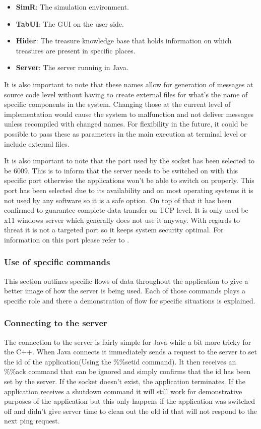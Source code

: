         \begin{itemize}
          \item \textbf{SimR}: The simulation environment.
          \item \textbf{TabUI}: The GUI on the user side.
          \item \textbf{Hider}: The treasure knowledge base that holds information on which treasures are present in specific places.
          \item \textbf{Server}: The server running in Java.
        \end{itemize}

      It is also important to note that these names allow for generation of messages at source code level without having to create external files for what's the name of specific components in the system. Changing those at the current level of implementation would cause the system to malfunction and not deliver messages unless recompiled with changed names. For flexibility in the future, it could be possible to pass these as parameters in the main execution at terminal level or include external files.

      It is also important to note that the port used by the socket has been selected to be 6009. This is to inform that the server needs to be switched on with this specific port otherwise the applications won't be able to switch on properly. This port has been selected due to its availability and on most operating systems it is not used by any software so it is a safe option. On top of that it has been confirmed to guarantee complete data transfer on TCP level. It is only used be x11 windows server which generally does not use it anyway. With regards to threat it is not a targeted port so it keeps system security optimal. For information on this port please refer to \cite{port6009}.

    \subsubsection{Use of specific commands}
      This section outlines specific flows of data throughout the application to give a better image of how the server is being used. Each of those commands plays a specific role and there a demonstration of flow for specific situations is explained.

      \subsubsection{Connecting to the server}
        The connection to the server is fairly simple for Java while a bit more tricky for the C++. When Java connects it immediately sends a request to the server to set the id of the application(Using the \%\%setid command). It then receives an \%\%ack command that can be ignored and simply confirms that the id has been set by the server. If the socket doesn't exist, the application terminates. If the application receives a shutdown command it will still work for demonstrative purposes of the application but this only happens if the application was switched off and didn't give server time to clean out the old id that will not respond to the next ping request.

